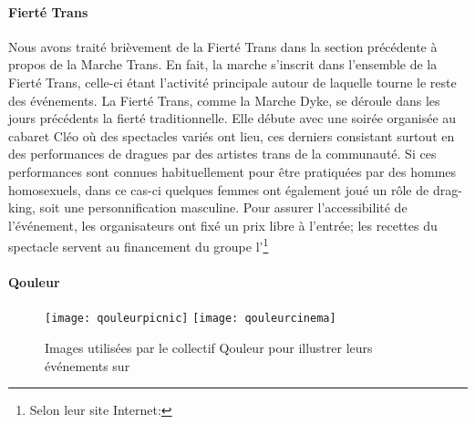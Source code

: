 \paragraph{Fierté Trans}
\label{subsec:fiertetrans}
Nous avons traité brièvement de la Fierté Trans dans la section précédente à propos de la Marche Trans.
En fait, la marche s'inscrit dans l'ensemble de la Fierté Trans, celle-ci étant l'activité principale autour de laquelle tourne le reste des événements.
La Fierté Trans, comme la Marche Dyke, se déroule dans les jours précédents la fierté traditionnelle.
Elle débute avec une soirée organisée au cabaret Cléo où des spectacles variés ont lieu, ces derniers consistant surtout en des performances de dragues par des artistes trans de la communauté.
Si ces performances sont connues habituellement pour être pratiquées par des hommes homosexuels, dans ce cas-ci quelques femmes ont également joué un rôle de drag-king, soit une personnification masculine.
Pour assurer l'accessibilité de l'événement, les organisateurs ont fixé un prix libre à l'entrée; les recettes du spectacle servent au financement du groupe l'\astteq{}\footnote{Selon leur site Internet: }

\paragraph{Qouleur}
\label{subsec:qouleur}

\begin{figure}
  \centering
  {\texttt{[image: qouleurpicnic]}}
  {\texttt{[image: qouleurcinema]}}
  \caption[Exemples d'images utilisées par Qouleur]{Images utilisées par le collectif Qouleur pour illustrer leurs événements sur }\label{figs:qouleurcinema}
\end{figure}

